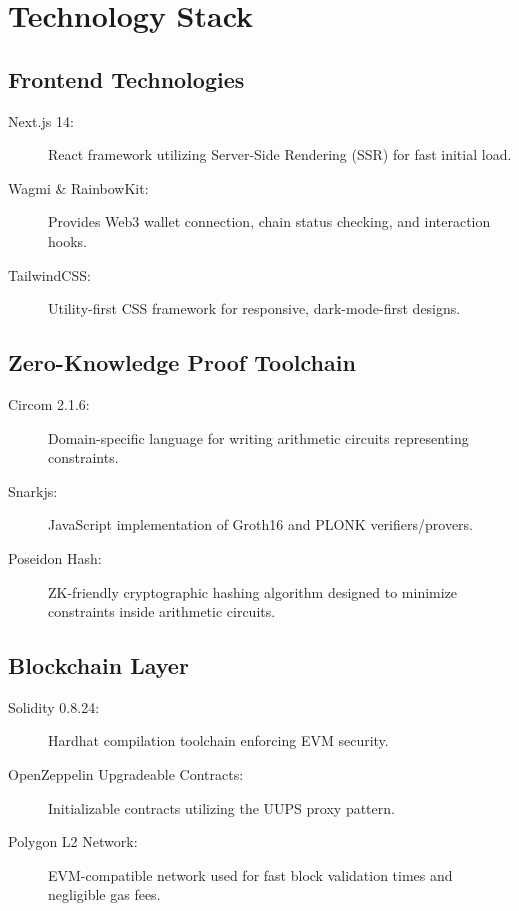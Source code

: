 \documentclass[12pt,a4paper,oneside]{report}
\begin{document}
\newpage

\chapter{Technology Stack}

\section{Frontend Technologies}
\begin{description}
    \item[Next.js 14:] React framework utilizing Server-Side Rendering (SSR) for fast initial load.
    \item[Wagmi \& RainbowKit:] Provides Web3 wallet connection, chain status checking, and interaction hooks.
    \item[TailwindCSS:] Utility-first CSS framework for responsive, dark-mode-first designs.
\end{description}

\section{Zero-Knowledge Proof Toolchain}
\begin{description}
    \item[Circom 2.1.6:] Domain-specific language for writing arithmetic circuits representing constraints.
    \item[Snarkjs:] JavaScript implementation of Groth16 and PLONK verifiers/provers.
    \item[Poseidon Hash:] ZK-friendly cryptographic hashing algorithm designed to minimize constraints inside arithmetic circuits.
\end{description}

\section{Blockchain Layer}
\begin{description}
    \item[Solidity 0.8.24:] Hardhat compilation toolchain enforcing EVM security.
    \item[OpenZeppelin Upgradeable Contracts:] Initializable contracts utilizing the UUPS proxy pattern.
    \item[Polygon L2 Network:] EVM-compatible network used for fast block validation times and negligible gas fees.
\end{description}
\end{document}
